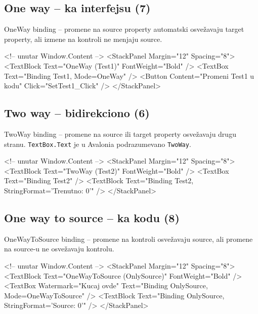 \documentclass[11pt,a4paper]{article}
\begin{document}
\subsection{One way – ka interfejsu (7)}
OneWay binding – promene na source property automatski osvežavaju target property, ali izmene na kontroli ne menjaju source.

\begin{CodeBlock}
<!-- unutar Window.Content -->
<StackPanel Margin="12" Spacing="8">
  <TextBlock Text="OneWay (Test1)" FontWeight="Bold" />
  <TextBox Text="{Binding Test1, Mode=OneWay}" />
  <Button Content="Promeni Test1 u kodu" Click="SetTest1_Click" />
</StackPanel>
\end{CodeBlock}


\subsection{Two way – bidirekciono (6)}
TwoWay binding – promene na source ili target property osvežavaju drugu stranu. \texttt{TextBox.Text} je u Avalonia podrazumevano \texttt{TwoWay}.

\begin{CodeBlock}
<!-- unutar Window.Content -->
<StackPanel Margin="12" Spacing="8">
  <TextBlock Text="TwoWay (Test2)" FontWeight="Bold" />
  <TextBox Text="{Binding Test2}" />
  <TextBlock Text="{Binding Test2, StringFormat='Trenutno: {0}'}" />
</StackPanel>
\end{CodeBlock}

\subsection{One way to source – ka kodu (8)}
OneWayToSource binding – promene na kontroli osvežavaju source, ali promene na source-u ne osvežavaju kontrolu.

\begin{CodeBlock}
<!-- unutar Window.Content -->
<StackPanel Margin="12" Spacing="8">
  <TextBlock Text="OneWayToSource (OnlySource)" FontWeight="Bold" />
  <TextBox Watermark="Kucaj ovde" Text="{Binding OnlySource, Mode=OneWayToSource}" />
  <TextBlock Text="{Binding OnlySource, StringFormat='Source: {0}'}" />
</StackPanel>
\end{CodeBlock}
\end{document}
